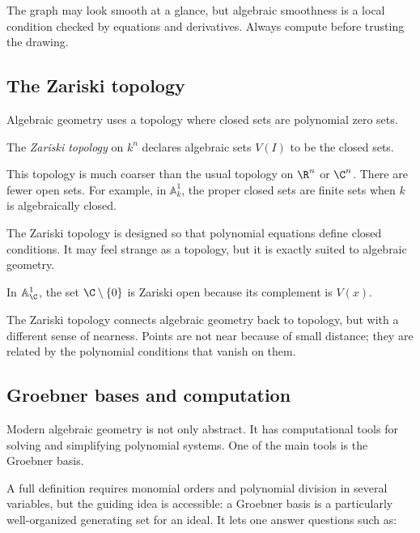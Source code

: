 \begin{trapbox}
The graph may look smooth at a glance, but algebraic smoothness is a local
condition checked by equations and derivatives. Always compute before trusting
the drawing.
\end{trapbox}

\subsection{The Zariski topology}

Algebraic geometry uses a topology where closed sets are polynomial zero sets.

\begin{definition}
The \emph{Zariski topology} on $k^n$ declares algebraic sets $V(I)$ to be the
closed sets.
\end{definition}

This topology is much coarser than the usual topology on $\R^n$ or $\C^n$.
There are fewer open sets. For example, in $\mathbb{A}^1_k$, the proper closed
sets are finite sets when $k$ is algebraically closed.

\begin{intuitionbox}
The Zariski topology is designed so that polynomial equations define closed
conditions. It may feel strange as a topology, but it is exactly suited to
algebraic geometry.
\end{intuitionbox}

\begin{example}
In $\mathbb{A}^1_\C$, the set $\C\setminus\{0\}$ is Zariski open because its
complement is $V(x)$.
\end{example}

The Zariski topology connects algebraic geometry back to topology, but with a
different sense of nearness. Points are not near because of small distance; they
are related by the polynomial conditions that vanish on them.

\subsection{Groebner bases and computation}

Modern algebraic geometry is not only abstract. It has computational tools for
solving and simplifying polynomial systems. One of the main tools is the
Groebner basis.

A full definition requires monomial orders and polynomial division in several
variables, but the guiding idea is accessible: a Groebner basis is a particularly
well-organized generating set for an ideal. It lets one answer questions such
as:

